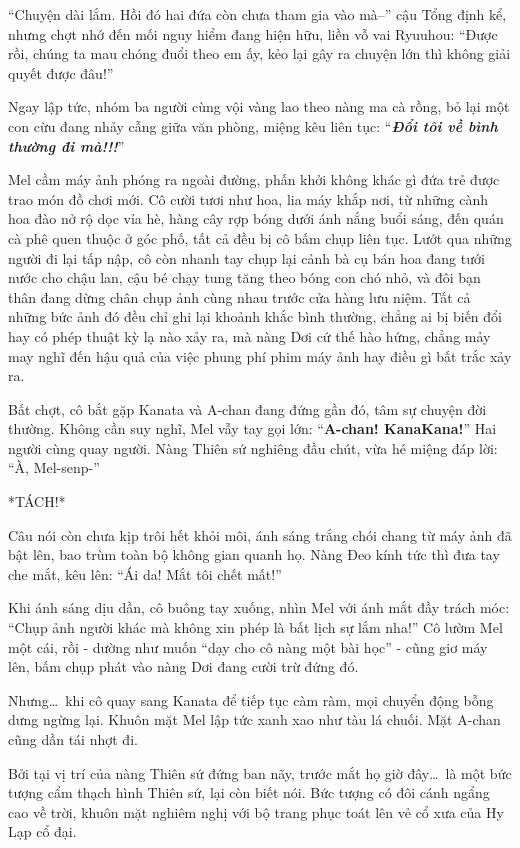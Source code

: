 \documentclass[../main.tex]{subfiles}
\begin{document}
``Chuyện dài lắm. Hồi đó hai đứa còn chưa tham gia vào mà--'' cậu Tổng định kể, nhưng chợt nhớ đến mối nguy hiểm đang hiện hữu, liền vỗ vai Ryuuhou: ``Được rồi, chúng ta mau chóng đuổi theo em ấy, kẻo lại gây ra chuyện lớn thì không giải quyết được đâu!''

Ngay lập tức, nhóm ba người cùng vội vàng lao theo nàng ma cà rồng, bỏ lại một con cừu đang nhảy cẫng giữa văn phòng, miệng kêu liên tục: ``\textbf{\textit{Đổi tôi về bình thường đi mà!!!}}''

\ct

Mel cầm máy ảnh phóng ra ngoài đường, phấn khởi không khác gì đứa trẻ được trao món đồ chơi mới. Cô cười tươi như hoa, lia máy khắp nơi, từ những cành hoa đào nở rộ dọc vỉa hè, hàng cây rợp bóng dưới ánh nắng buổi sáng, đến quán cà phê quen thuộc ở góc phố, tất cả đều bị cô bấm chụp liên tục. Lướt qua những người đi lại tấp nập, cô còn nhanh tay chụp lại cảnh bà cụ bán hoa đang tưới nước cho chậu lan, cậu bé chạy tung tăng theo bóng con chó nhỏ, và đôi bạn thân đang dừng chân chụp ảnh cùng nhau trước cửa hàng lưu niệm. Tất cả những bức ảnh đó đều chỉ ghi lại khoảnh khắc bình thường, chẳng ai bị biến đổi hay có phép thuật kỳ lạ nào xảy ra, mà nàng Dơi cứ thế hào hứng, chẳng mảy may nghĩ đến hậu quả của việc phung phí phim máy ảnh hay điều gì bất trắc xảy ra.

Bất chợt, cô bắt gặp Kanata và A-chan đang đứng gần đó, tâm sự chuyện đời thường. Không cần suy nghĩ, Mel vẫy tay gọi lớn: ``\textbf{A-chan! KanaKana!}'' Hai người cùng quay người. Nàng Thiên sứ nghiêng đầu chút, vừa hé miệng đáp lời: ``À, Mel-senp-''

*TÁCH!*

Câu nói còn chưa kịp trôi hết khỏi môi, ánh sáng trắng chói chang từ máy ảnh đã bật lên, bao trùm toàn bộ không gian quanh họ. Nàng Đeo kính tức thì đưa tay che mắt, kêu lên: ``Ái da! Mắt tôi chết mất!''

Khi ánh sáng dịu dần, cô buông tay xuống, nhìn Mel với ánh mắt đầy trách móc: ``Chụp ảnh người khác mà không xin phép là bất lịch sự lắm nha!'' Cô lườm Mel một cái, rồi - dường như muốn ``dạy cho cô nàng một bài học'' - cũng giơ máy lên, bấm chụp phát vào nàng Dơi đang cười trừ đứng đó.

Nhưng\dots\ khi cô quay sang Kanata để tiếp tục càm ràm, mọi chuyển động bỗng dưng ngừng lại. Khuôn mặt Mel lập tức xanh xao như tàu lá chuối. Mặt A-chan cũng dần tái nhợt đi.

Bởi tại vị trí của nàng Thiên sứ đứng ban nãy, trước mắt họ giờ đây\dots\ là một bức tượng cẩm thạch hình Thiên sứ, lại còn biết nói. Bức tượng có đôi cánh ngẩng cao về trời, khuôn mặt nghiêm nghị với bộ trang phục toát lên vẻ cổ xưa của Hy Lạp cổ đại.
\end{document}
